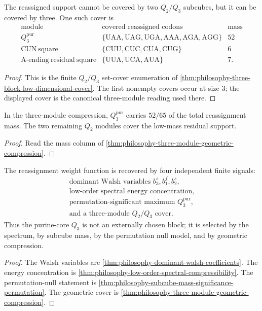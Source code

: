 \begin{theorem}
\label{thm:philosophy-three-module-geometric-compression}
The reassigned support cannot be covered by two $Q_{2}/Q_{3}$ subcubes,
but it can be covered by three. One such cover is
$$
\begin{array}{c|c|r}
  \text{module} & \text{covered reassigned codons} & \text{mass}\\
\hline
  Q_{3}^{\mathrm{pur}}
    & \{\mathrm{UAA},\mathrm{UAG},\mathrm{UGA},
       \mathrm{AAA},\mathrm{AGA},\mathrm{AGG}\} & 52\\
  \mathrm{CUN\ square}
    & \{\mathrm{CUU},\mathrm{CUC},\mathrm{CUA},\mathrm{CUG}\} & 6\\
  \mathrm{A\text{-}ending\ residual\ square}
    & \{\mathrm{UUA},\mathrm{UCA},\mathrm{AUA}\} & 7.
\end{array}
$$
\end{theorem}
\begin{proof}
This is the finite $Q_{2}/Q_{3}$ set-cover enumeration of
\autoref{thm:philosophy-three-block-low-dimensional-cover}. The first
nonempty covers occur at size $3$; the displayed cover is the canonical
three-module reading used there.
\end{proof}

\begin{corollary}
\label{cor:philosophy-purine-core-dominates-minimal-compression}
In the three-module compression, $Q_{3}^{\mathrm{pur}}$ carries
$52/65$ of the total reassignment mass. The two remaining $Q_{2}$
modules cover the low-mass residual support.
\end{corollary}
\begin{proof}
Read the mass column of
\autoref{thm:philosophy-three-module-geometric-compression}.
\end{proof}

\begin{theorem}
\label{thm:philosophy-spectral-compression-statement}
The reassignment weight function is recovered by four independent
finite signals:
$$
\begin{gathered}
  \text{dominant Walsh variables } b_{3}^{s},b_{1}^{f},b_{2}^{s},\\
  \text{low-order spectral energy concentration},\\
  \text{permutation-significant maximum }Q_{3}^{\mathrm{pur}},\\
  \text{and a three-module }Q_{2}/Q_{3}\text{ cover}.
\end{gathered}
$$
Thus the purine-core $Q_{3}$ is not an externally chosen block; it is
selected by the spectrum, by subcube mass, by the permutation null
model, and by geometric compression.
\end{theorem}
\begin{proof}
The Walsh variables are
\autoref{thm:philosophy-dominant-walsh-coefficients}. The energy
concentration is
\autoref{thm:philosophy-low-order-spectral-compressibility}. The
permutation-null statement is
\autoref{thm:philosophy-subcube-mass-significance-permutation}. The
geometric cover is
\autoref{thm:philosophy-three-module-geometric-compression}.
\end{proof}

